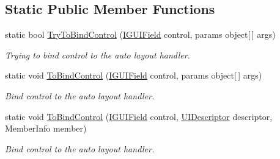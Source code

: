 \subsection*{Static Public Member Functions}
\begin{DoxyCompactItemize}
\item 
static bool \mbox{\hyperlink{class_wpf_handler_1_1_u_i_1_1_auto_layout_1_1_u_i_descriptor_a51be997d431bb7a6d73de302f60f6dd9}{Try\+To\+Bind\+Control}} (\mbox{\hyperlink{interface_wpf_handler_1_1_u_i_1_1_auto_layout_1_1_i_g_u_i_field}{I\+G\+U\+I\+Field}} control, params object\mbox{[}$\,$\mbox{]} args)
\begin{DoxyCompactList}\small\item\em Trying to bind control to the auto layout handler. \end{DoxyCompactList}\item 
static void \mbox{\hyperlink{class_wpf_handler_1_1_u_i_1_1_auto_layout_1_1_u_i_descriptor_a129506a55a400487664febab7ea85266}{To\+Bind\+Control}} (\mbox{\hyperlink{interface_wpf_handler_1_1_u_i_1_1_auto_layout_1_1_i_g_u_i_field}{I\+G\+U\+I\+Field}} control, params object\mbox{[}$\,$\mbox{]} args)
\begin{DoxyCompactList}\small\item\em Bind control to the auto layout handler. \end{DoxyCompactList}\item 
static void \mbox{\hyperlink{class_wpf_handler_1_1_u_i_1_1_auto_layout_1_1_u_i_descriptor_a763e1f50836b07edf0a3e6579454c335}{To\+Bind\+Control}} (\mbox{\hyperlink{interface_wpf_handler_1_1_u_i_1_1_auto_layout_1_1_i_g_u_i_field}{I\+G\+U\+I\+Field}} control, \mbox{\hyperlink{class_wpf_handler_1_1_u_i_1_1_auto_layout_1_1_u_i_descriptor}{U\+I\+Descriptor}} descriptor, Member\+Info member)
\begin{DoxyCompactList}\small\item\em Bind control to the auto layout handler. \end{DoxyCompactList}\end{DoxyCompactItemize}
